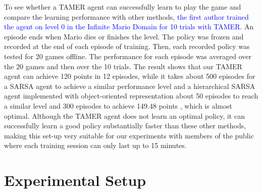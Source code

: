 To see whether a TAMER agent can successfully learn to play the game and compare the learning performance with other methods, 
\textcolor{blue}{the first author trained the agent on level 0 %
in the Infinite Mario Domain for 10 trials with TAMER. }
An episode ends when Mario dies or finishes the level. The policy was frozen and recorded at the end of each episode of training. Then, each recorded policy was tested for 20 games offline. The performance for each episode %
was averaged over the 20 games and then over the 10 trials. The result shows that our TAMER agent can achieve 120 points in 12 episodes, while it takes about 500 episodes for a SARSA agent to achieve a similar performance level \cite{taylor2011teaching} and a hierarchical SARSA agent implemented with object-oriented representation about 50 episodes to reach a similar level and 300 episodes to achieve 149.48 points \cite{mohan2011object}, which is almost optimal. Although the TAMER agent does not learn an optimal policy, it can successfully learn a good policy substantially faster than these other methods, making this set-up very suitable for our experiments with members of the public where each training session can only last up to 15 minutes.


\section{Experimental Setup}
\label{sec:es}

